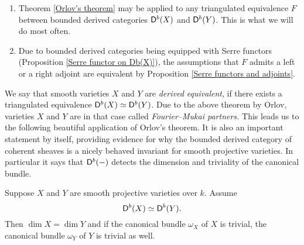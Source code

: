 \begin{remark}
    \begin{enumerate}[label = (\roman*)]
        \item Theorem \ref{Orlov's theorem} may be applied to any triangulated equivalence $F$ between bounded derived categories $\mathsf{D}^b(X)$ and $\mathsf{D}^b(Y)$. This is what we will do most often. 
        \item Due to bounded derived categories being equipped with Serre functors (Proposition \ref{Serre functor on Db(X)}), the assumptions that $F$ admits a left or a right adjoint are equivalent by Proposition \ref{Serre functors and adjoints}.
    \end{enumerate}
\end{remark}

We say that smooth varieties $X$ and $Y$ are \emph{derived equivalent}, if there exists a triangulated equivalence $\mathsf{D}^b(X) \simeq \mathsf{D}^b(Y)$. Due to the above theorem by Orlov, varieties $X$ and $Y$ are in that case called \emph{Fourier--Mukai partners.}
This leads us to the following beautiful application of Orlov's theorem. It is also an important statement by itself, providing evidence for why the bounded derived category of coherent sheaves is a nicely behaved invariant for smooth projective varieties. In particular it says that $\mathsf{D}^b(-)$ detects the dimension and triviality of the canonical bundle.  
\begin{theorem}
    \label{Db detects dimension and triviality of canonical bundle}
    Suppose $X$ and $Y$ are smooth projective varieties over $k$. Assume
    \[
        \mathsf{D}^b(X) \simeq \mathsf{D}^b(Y).
    \]
    Then $\dim X = \dim Y$ and if the canonical bundle $\omega_X$ of $X$ is trivial, the canonical bundle $\omega_Y$ of $Y$ is trivial as well.
\end{theorem}

